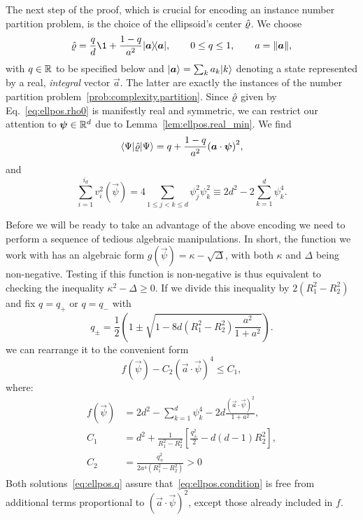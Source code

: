 The next step of the proof, which is crucial for encoding an instance number partition problem, is the choice of the ellipsoid's center $\hat{\varrho}$.
We choose
\[
  \estim{\varrho}=\frac{q}{d}\1+\frac{1-q}{a^{2}} \ket{\vec a} \bra{\vec a},\qquad0\leq q\leq1,\qquad a=\norm{\vec a},
  \label{eq:ellpos.rho0}
\]
with $q \in \mathbb{R}$ to be specified below and $\ket{\vec a} =\sum_{k}a_{k}\ket{k} $ denoting a state represented by a real, \emph{integral} vector $\vec{a}$.
The latter are exactly the instances of the number partition problem~\ref{prob:complexity.partition}.
Since $\hat{\varrho}$ given by Eq.~\eqref{eq:ellpos.rho0} is manifestly real and symmetric, we can restrict our attention to ${\boldsymbol{\psi}} \in \mathbb{R}^d$ due to Lemma~\ref{lem:ellpos.real_min}. We find
\[
  \bra{\Psi}\estim{\varrho} \ket{\Psi} =q+\frac{1-q}{a^{2}}{\left(\vec{a}\cdot\vec{\psi}\right)}^{2},
\]
and
\[
  \sum_{i=1}^{i_{d}}v_{i}^{2}\left(\vec\psi\right)=4\sum_{1\leq j<k\leq d}\psi_{j}^{2}\psi_{k}^{2}\equiv2d^{2}-2\sum_{k=1}^{d}\psi_{k}^{4}.
\]

Before we will be ready to take an advantage of the above encoding we need to  perform a sequence of tedious algebraic manipulations. In short, the function we work with has an algebraic form $g(\vec\psi)=\kappa-\sqrt{\Delta}$, with both $\kappa$ and $\Delta$ being non-negative. Testing if this function is non-negative is thus equivalent to checking the inequality $\kappa^2- \Delta\geq 0$. If we divide this inequality by $2(R_1^2-R_2^2)$ and fix $q=q_+$ or $q=q_-$ with
\[
  q_{\pm}=\frac{1}{2}\left(1\pm\sqrt{1-8d\left(R_{1}^{2}-R_{2}^{2}\right)\frac{a^{2}}{1+a^{2}}}\right).\label{eq:ellpos.q}
\]
we can rearrange it to the convenient form
\[
  f\left(\vec{\psi}\right)-C_{2}{\left(\vec{a}\cdot\vec{\psi}\right)}^{4}\leq C_{1},
  \label{eq:ellpos.condition}
\]
where:
\begin{align}
  f\left(\vec{\psi}\right) &= 2d^{2}-\sum_{k=1}^{d}\psi_{k}^{4}-2d\frac{{\left(\vec{a}\cdot\vec{\psi}\right)}^{2}}{1+a^{2}}, \\
  \label{eq:ellpos.def_c1}
  C_{1}&=d^{2}+\frac{1}{R_{1}^{2}-R_{2}^{2}}\left[\frac{q_{\pm}^{2}}{2}-d\left(d-1\right)R_{2}^{2}\right], \\
  C_{2}&=\frac{q_{\mp}^{2}}{2a^{4}\left(R_{1}^{2}-R_{2}^{2}\right)}>0
\end{align}
Both solutions~\eqref{eq:ellpos.q} assure that~\eqref{eq:ellpos.condition} is free from additional terms proportional to ${\left(\vec{a}\cdot\vec{\psi}\right)}^{2}$, except those already included in $f$.

